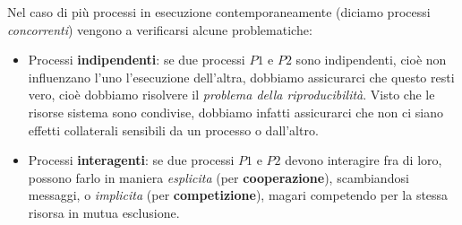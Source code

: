 \documentclass[a4paper,11pt]{article}
\begin{document}
Nel caso di più processi in esecuzione contemporaneamente (diciamo processi \textit{concorrenti}) vengono a verificarsi alcune problematiche:
\begin{itemize}
	\item Processi \textbf{indipendenti}: se due processi $P1$ e $P2$ sono indipendenti, cioè non influenzano l'uno l'esecuzione dell'altra, dobbiamo assicurarci che questo resti vero, cioè dobbiamo risolvere il \textit{problema della riproducibilità}. Visto che le risorse sistema sono condivise, dobbiamo infatti assicurarci che non ci siano effetti collaterali sensibili da un processo o dall'altro.
	\item Processi \textbf{interagenti}: se due processi $P1$ e $P2$ devono interagire fra di loro, possono farlo in maniera \textit{esplicita} (per \textbf{cooperazione}), scambiandosi messaggi, o \textit{implicita} (per \textbf{competizione}), magari competendo per la stessa risorsa in mutua esclusione.
\end{itemize}
\end{document}
